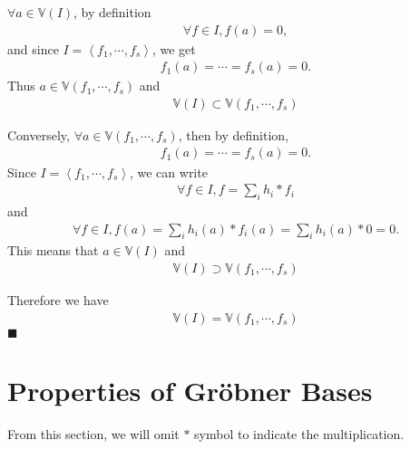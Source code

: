 \documentclass[11pt]{book}
\begin{document}
$\forall a \in \mathbb{V}(I)$, by definition
\begin{eqnarray}
\forall f \in I, f(a) = 0,
\end{eqnarray}
and since $I = \left< f_1, \cdots, f_s \right>$, we get
\begin{eqnarray}
f_1(a) = \cdots = f_s(a) = 0.
\end{eqnarray}
Thus $a \in \mathbb{V}(f_1, \cdots, f_s)$ and
\begin{eqnarray}
\mathbb{V}(I) \subset \mathbb{V}(f_1, \cdots, f_s)
\end{eqnarray}

Conversely, $\forall a \in \mathbb{V}(f_1, \cdots, f_s)$, then by definition,
\begin{eqnarray}
f_1(a) = \cdots = f_s(a) = 0.
\end{eqnarray}
Since $I = \left< f_1, \cdots, f_s \right>$, we can write
\begin{eqnarray}
\forall f \in I, f = \sum_i h_i * f_i
\end{eqnarray}
and 
\begin{eqnarray}
\forall f \in I, f(a) = \sum_i h_i(a) * f_i(a) = \sum_i h_i(a) * 0 = 0.
\end{eqnarray}
This means that $a \in \mathbb{V}(I)$ and
\begin{eqnarray}
\mathbb{V}(I) \supset \mathbb{V}(f_1, \cdots, f_s)
\end{eqnarray}

Therefore we have
\begin{eqnarray}
\mathbb{V}(I) = \mathbb{V}(f_1, \cdots, f_s)
\end{eqnarray}
$\blacksquare$

\section{Properties of Gr\"obner Bases}
From this section, we will omit $*$ symbol to indicate the multiplication.
\end{document}
